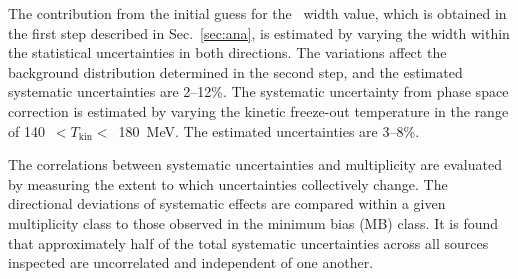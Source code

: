 The contribution from the initial guess for the \fzero~width value, which is obtained in the first step described in Sec.~\ref{sec:ana}, is estimated by varying the width within the statistical uncertainties in both directions. The variations affect the background distribution determined in the second step, and the estimated systematic uncertainties are 2--12\%. The systematic uncertainty from phase space correction is estimated by varying the kinetic freeze-out temperature in the range of 140~$<T_{\mathrm{kin}}<$~180~MeV. The estimated uncertainties are 3--8\%. 

The correlations between systematic uncertainties and multiplicity are evaluated by measuring the extent to which uncertainties collectively change. The directional deviations of systematic effects are compared within a given multiplicity class to those observed in the minimum bias (MB) class. It is found that approximately half of the total systematic uncertainties across all sources inspected are uncorrelated and independent of one another.
